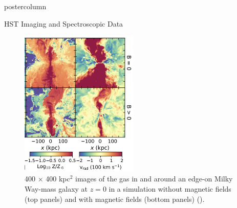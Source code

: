 \documentclass{beamer}
\begin{document}
\begin{frame}
\begin{columns}[T]
\begin{column}{0.48\textwidth}
\begin{beamercolorbox}[center,wd=\textwidth]{postercolumn}
\begin{block}{HST Imaging and Spectroscopic Data}
\begin{figure}
\begin{minipage}{0.5\textwidth}
              \includegraphics[width=0.5\textwidth]{./images/voort_simulation}
              \caption{400 $\times$ 400 kpc$^{2}$ images of the gas in and around an edge-on Milky Way-mass galaxy at $z=0$ in a simulation without magnetic fields (top panels) and with magnetic fields (bottom panels) (\cite{2021MNRAS.501.4888V}). }
              \label{fig:3}
            \end{minipage}
          \end{figure}


\end{block}
\end{beamercolorbox}
\end{column}
\end{columns}
\end{frame}
\end{document}

